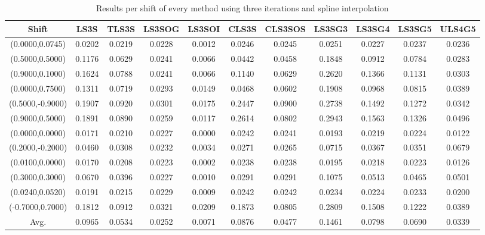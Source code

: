 \begin{table}[ht!]
\centering
\begin{tabular}{c|c|c|c|c|c|c|c|c|c|c}
Shift & \scriptsize{LS3S} & \scriptsize{TLS3S} & \scriptsize{LS3SOG} & \scriptsize{LS3SOI} & \scriptsize{CLS3S} & \scriptsize{CLS3SOS} & \scriptsize{LS3SG3} & \scriptsize{LS3SG4} & \scriptsize{LS3SG5} & \scriptsize{ULS4G5}\\ \hline 
(0.0000,0.0745) & 0.0202 & 0.0219 & 0.0228 & 0.0012 & 0.0246 & 0.0245 & 0.0251 & 0.0227 & 0.0237 & 0.0236 \\ \hline
(0.5000,0.5000) & 0.1176 & 0.0629 & 0.0241 & 0.0066 & 0.0442 & 0.0458 & 0.1848 & 0.0912 & 0.0784 & 0.0283 \\ \hline
(0.9000,0.1000) & 0.1624 & 0.0788 & 0.0241 & 0.0066 & 0.1140 & 0.0629 & 0.2620 & 0.1366 & 0.1131 & 0.0303 \\ \hline
(0.0000,0.7500) & 0.1311 & 0.0719 & 0.0293 & 0.0149 & 0.0468 & 0.0602 & 0.1908 & 0.0968 & 0.0815 & 0.0389 \\ \hline
(0.5000,-0.9000) & 0.1907 & 0.0920 & 0.0301 & 0.0175 & 0.2447 & 0.0900 & 0.2738 & 0.1492 & 0.1272 & 0.0342 \\ \hline
(0.9000,0.5000) & 0.1891 & 0.0890 & 0.0259 & 0.0117 & 0.2614 & 0.0802 & 0.2943 & 0.1563 & 0.1326 & 0.0496 \\ \hline
(0.0000,0.0000) & 0.0171 & 0.0210 & 0.0227 & 0.0000 & 0.0242 & 0.0241 & 0.0193 & 0.0219 & 0.0224 & 0.0122 \\ \hline
(0.2000,-0.2000) & 0.0460 & 0.0308 & 0.0232 & 0.0034 & 0.0271 & 0.0265 & 0.0715 & 0.0367 & 0.0351 & 0.0679 \\ \hline
(0.0100,0.0000) & 0.0170 & 0.0208 & 0.0223 & 0.0002 & 0.0238 & 0.0238 & 0.0195 & 0.0218 & 0.0223 & 0.0126 \\ \hline
(0.3000,0.3000) & 0.0670 & 0.0396 & 0.0227 & 0.0010 & 0.0291 & 0.0291 & 0.1075 & 0.0513 & 0.0465 & 0.0501 \\ \hline
(0.0240,0.0520) & 0.0191 & 0.0215 & 0.0229 & 0.0009 & 0.0242 & 0.0242 & 0.0234 & 0.0224 & 0.0233 & 0.0200 \\ \hline
(-0.7000,0.7000) & 0.1812 & 0.0912 & 0.0321 & 0.0209 & 0.1873 & 0.0805 & 0.2809 & 0.1508 & 0.1222 & 0.0389 \\ \hline
Avg.  & 0.0965 & 0.0534 & 0.0252 & 0.0071 & 0.0876 & 0.0477 & 0.1461 & 0.0798 & 0.0690 & 0.0339 \\ \hline
\end{tabular}
\caption{Results per shift of every method using three iterations and spline interpolation}
\label{tab:3itSperShift}
\end{table}


